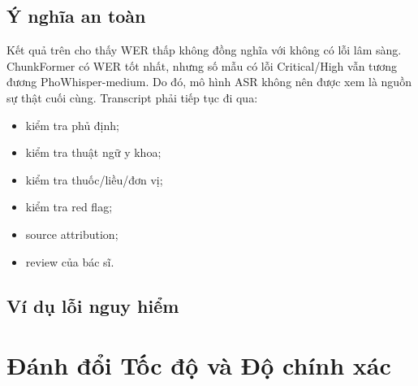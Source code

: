 \documentclass[12pt,a4paper]{article}
\begin{document}
\subsection{Ý nghĩa an toàn}

Kết quả trên cho thấy WER thấp không đồng nghĩa với không có lỗi lâm sàng. ChunkFormer có WER tốt nhất, nhưng số mẫu có lỗi Critical/High vẫn tương đương PhoWhisper-medium. Do đó, mô hình ASR không nên được xem là nguồn sự thật cuối cùng. Transcript phải tiếp tục đi qua:
\begin{itemize}[leftmargin=1.2cm]
    \item kiểm tra phủ định;
    \item kiểm tra thuật ngữ y khoa;
    \item kiểm tra thuốc/liều/đơn vị;
    \item kiểm tra red flag;
    \item source attribution;
    \item review của bác sĩ.
\end{itemize}

\subsection{Ví dụ lỗi nguy hiểm}

\begin{table}[h]
\centering
\caption{Ví dụ lỗi lâm sàng từ manual audit}
\end{table}

\section{Đánh đổi Tốc độ và Độ chính xác}
\end{document}
